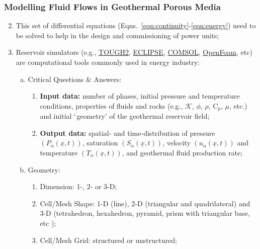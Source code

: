 \documentclass[10pt,compress]{beamer}
\begin{document}
\begin{frame}
 \frametitle{Modelling Fluid Flows in Geothermal Porous Media}
         \begin{enumerate}[1.]\setcounter{enumi}{1}\scriptsize
            \item <1-> This set of differential equations (Eqns.~\ref{eqn:continuity}-\ref{eqn:energy}) need to be solved to help in the design and commissioning of power units;
            \item <2-> Reservoir simulators (e.g., \href{http://esd1.lbl.gov/research/projects/tough/software/tough2.html}{TOUGH2}, \href{http://www.software.slb.com/products/foundation/pages/eclipse.aspx}{ECLIPSE}, \href{http://www.uk.comsol.com/}{COMSOL}, \href{http://www.openfoam.com/} {OpenFoam}, etc) are computational tools commonly used in energy industry:
               \begin{enumerate}[(a)]\scriptsize
                   \item <3-> Critical Questions $\&$ Answers:
                       \begin{enumerate}[{a.}i)]\scriptsize
                          \item <4-> {\bf Input data:} number of phases, initial pressure and temperature conditions, properties of fluids and rocks (e.g., $\mathcal{K}$, $\phi$, $\rho$, C$_{p}$, $\mu$, etc.) and initial $\lq$geometry' of the geothermal reservoir field;
                          \item <5-> {\bf Output data:} spatial- and time-distribution of pressure $\left(P_{\alpha}\left(\underline{x},t\right)\right)$, saturation $\left(S_{\alpha}\left(\underline{x},t\right)\right)$, velocity $\left(u_{\alpha}\left(\underline{x},t\right)\right)$ and  temperature $\left(T_{\alpha}\left(\underline{x},t\right)\right)$, and geothermal fluid production rate;
                       \end{enumerate}
                   \item <6-> Geometry:
                       \begin{enumerate}[{b.}i)]\scriptsize
                          \item <6-> Dimension: 1-, 2- or 3-D;
                          \item <6-> Cell/Mesh Shape: 1-D (line), 2-D (triangular and quadrilateral) and 3-D (tetrahedron, hexahedron, pyramid, prism with triangular base, etc );
                          \item <6-> Cell/Mesh Grid: structured or unstructured;

\end{enumerate}
\end{enumerate}
\end{enumerate}
\end{frame}
\end{document}
